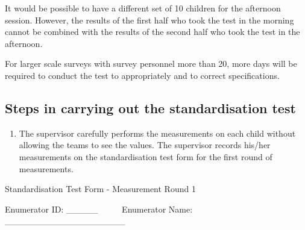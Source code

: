 \documentclass[12pt,]{book}
\providecommand{\tightlist}{%
  \setlength{\itemsep}{0pt}\setlength{\parskip}{0pt}}
\theoremstyle{definition}
\theoremstyle{definition}
\theoremstyle{definition}
\theoremstyle{remark}
\begin{document}
It would be possible to have a different set of 10 children for the
afternoon session. However, the results of the first half who took the
test in the morning cannot be combined with the results of the second
half who took the test in the afternoon.

For larger scale surveys with survey personnel more than 20, more days
will be required to conduct the test to appropriately and to correct
specifications.

\hypertarget{steps-in-carrying-out-the-standardisation-test}{%
\subsection{Steps in carrying out the standardisation
test}\label{steps-in-carrying-out-the-standardisation-test}}

\begin{enumerate}
\def\labelenumi{\arabic{enumi}.}
\tightlist
\item
  The supervisor carefully performs the measurements on each child
  without allowing the teams to see the values. The supervisor records
  his/her measurements on the standardisation test form for the first
  round of measurements.
\end{enumerate}

Standardisation Test Form - Measurement Round 1

Enumerator ID: \_\_\_\_\_ ~ ~ ~ Enumerator Name:
\_\_\_\_\_\_\_\_\_\_\_\_\_\_\_\_\_\_\_
\end{document}
